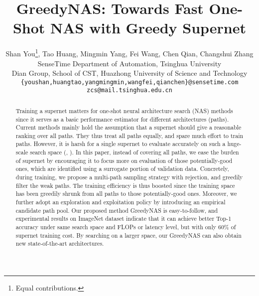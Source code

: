 \documentclass[10pt,twocolumn,letterpaper]{article}
\begin{document}
\title{GreedyNAS: Towards Fast One-Shot NAS with Greedy Supernet}
\author{Shan You\thanks{Equal contributions.}, Tao Huang, Mingmin Yang, Fei Wang, Chen Qian, Changshui Zhang\\
SenseTime   \quad Department of Automation, Tsinghua University\\
Dian Group, School of CST, Huazhong University of Science and Technology\\
{\tt\small \{youshan,huangtao,yangmingmin,wangfei,qianchen\}@sensetime.com zcs@mail.tsinghua.edu.cn}
}

\maketitle


\begin{abstract}
	Training a supernet matters for one-shot neural architecture search (NAS) methods since it serves as a basic performance estimator for different architectures (paths). Current methods mainly hold the assumption that a supernet should give a reasonable ranking over all paths. They thus treat all paths equally, and spare much effort to train paths. However, it is harsh for a single supernet to evaluate accurately on such a huge-scale search space (\eg, ). In this paper, instead of covering all paths, we ease the burden of supernet by encouraging it to focus more on evaluation of those potentially-good ones, which are identified using a surrogate portion of validation data. Concretely, during training, we propose a multi-path sampling strategy with rejection, and greedily filter the weak paths. The training efficiency is thus boosted since the training space has been greedily shrunk from all paths to those potentially-good ones. Moreover, we further adopt an exploration and exploitation policy by introducing an empirical candidate path pool. Our proposed method GreedyNAS is easy-to-follow, and experimental results on ImageNet dataset indicate that it can achieve better Top-1 accuracy under same search space and FLOPs or latency level, but 
	with only 60\% of supernet training cost. By searching on a larger space, our GreedyNAS can also obtain new state-of-the-art architectures. 
	

	
	\vspace{-5mm}


	
	
	
	
	
	
	
	
	
	
	
\end{abstract}
\end{document}
